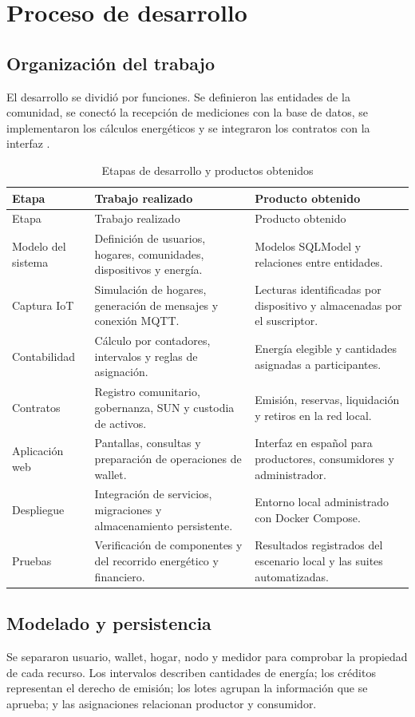\section{Proceso de desarrollo}
\subsection{Organización del trabajo}
El desarrollo se dividió por funciones. Se definieron las entidades de la comunidad, se conectó la recepción de mediciones con la base de datos, se implementaron los cálculos energéticos y se integraron los contratos con la interfaz \citep{development,architecture}.

\begin{longtable}{L{.23\linewidth}L{.34\linewidth}L{.33\linewidth}}
\caption{Etapas de desarrollo y productos obtenidos}\label{tab:etapas}\\
\toprule Etapa & Trabajo realizado & Producto obtenido \\ \midrule\endfirsthead
\toprule Etapa & Trabajo realizado & Producto obtenido \\ \midrule\endhead
Modelo del sistema & Definición de usuarios, hogares, comunidades, dispositivos y energía. & Modelos SQLModel y relaciones entre entidades.\\
Captura IoT & Simulación de hogares, generación de mensajes y conexión MQTT. & Lecturas identificadas por dispositivo y almacenadas por el suscriptor.\\
Contabilidad & Cálculo por contadores, intervalos y reglas de asignación. & Energía elegible y cantidades asignadas a participantes.\\
Contratos & Registro comunitario, gobernanza, SUN y custodia de activos. & Emisión, reservas, liquidación y retiros en la red local.\\
Aplicación web & Pantallas, consultas y preparación de operaciones de wallet. & Interfaz en español para productores, consumidores y administrador.\\
Despliegue & Integración de servicios, migraciones y almacenamiento persistente. & Entorno local administrado con Docker Compose.\\
Pruebas & Verificación de componentes y del recorrido energético y financiero. & Resultados registrados del escenario local y las suites automatizadas.\\
\bottomrule
\end{longtable}

\subsection{Modelado y persistencia}
Se separaron usuario, wallet, hogar, nodo y medidor para comprobar la propiedad de cada recurso. Los intervalos describen cantidades de energía; los créditos representan el derecho de emisión; los lotes agrupan la información que se aprueba; y las asignaciones relacionan productor y consumidor.


